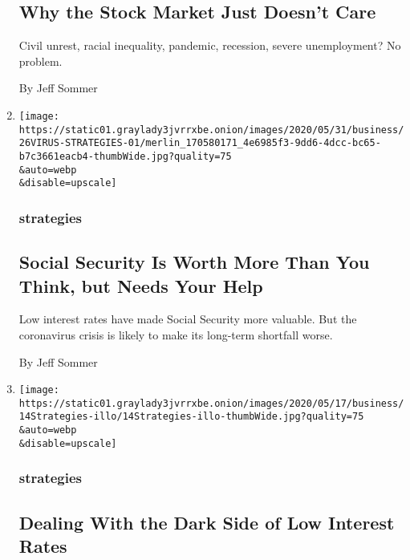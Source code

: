 \begin{enumerate}
{  \subsection{Why the Stock Market Just Doesn't
  Care}\label{why-the-stock-market-just-doesnt-care}}

  Civil unrest, racial inequality, pandemic, recession, severe
  unemployment? No problem.

  By Jeff Sommer
\item
  \href{/2020/05/29/business/Social-Security-benefits-shortfall-coronavirus.html}{}

  \texttt{[image: https://static01.graylady3jvrrxbe.onion/images/2020/05/31/business/26VIRUS-STRATEGIES-01/merlin\_170580171\_4e6985f3-9dd6-4dcc-bc65-b7c3661eacb4-thumbWide.jpg?quality=75\\\&auto=webp\\\&disable=upscale]}

  \hypertarget{strategies-6}{%
  \subsubsection{strategies}\label{strategies-6}}

  \hypertarget{social-security-is-worth-more-than-you-think-but-needs-your-help}{%
  \subsection{Social Security Is Worth More Than You Think, but Needs
  Your
  Help}\label{social-security-is-worth-more-than-you-think-but-needs-your-help}}

  Low interest rates have made Social Security more valuable. But the
  coronavirus crisis is likely to make its long-term shortfall worse.

  By Jeff Sommer
\item
  \href{/2020/05/15/business/strategies-investing-interest-rates.html}{}

  \texttt{[image: https://static01.graylady3jvrrxbe.onion/images/2020/05/17/business/14Strategies-illo/14Strategies-illo-thumbWide.jpg?quality=75\\\&auto=webp\\\&disable=upscale]}

  \hypertarget{strategies-7}{%
  \subsubsection{strategies}\label{strategies-7}}

  \hypertarget{dealing-with-the-dark-side-of-low-interest-rates}{%
  \subsection{Dealing With the Dark Side of Low Interest
  Rates}\label{dealing-with-the-dark-side-of-low-interest-rates}}


\end{enumerate}
